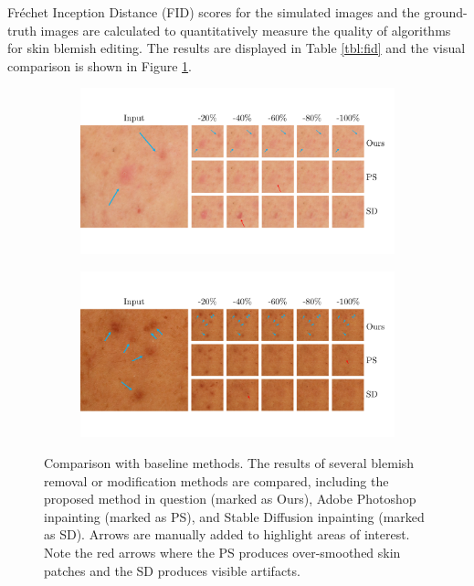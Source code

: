 \begin{spacing}{1.5}
Fréchet Inception Distance (FID) scores for the simulated images and the ground-truth images are calculated to quantitatively measure the quality of algorithms for skin blemish editing. The results are displayed in Table \ref{tbl:fid} and the visual comparison is shown in Figure \ref{fig:baseline}.
\begin{figure}[t!]
    \centering
    \begin{subfigure}{.9\textwidth}
        \centering
        \includegraphics[width=\linewidth]{Chapter5/baseline11.pdf}
    \end{subfigure}
    \hfill
    \begin{subfigure}{.9\textwidth}
        \centering
        \includegraphics[width=\linewidth]{Chapter5/baseline12.pdf}
    \end{subfigure}
    \caption{Comparison with baseline methods. The results of several blemish removal or modification methods are compared, including the proposed method in question (marked as Ours), Adobe Photoshop\cite{adobephotoshop} inpainting (marked as PS), and Stable Diffusion\cite{rombach2021highresolution} inpainting (marked as SD). Arrows are manually added to highlight areas of interest. Note the red arrows where the PS produces over-smoothed skin patches and the SD produces visible artifacts.}
    \label{fig:baseline}
\end{figure}


\end{spacing}

